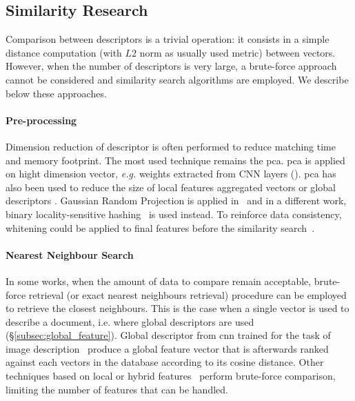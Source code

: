 	\subsection{Similarity Research}
	\label{subsec:similarity_research}

	    Comparison between descriptors is a trivial operation: it consists in a simple distance computation (with $L2$ norm as usually used metric) between vectors. However, when the number of descriptors is very large, a brute-force approach cannot be considered and similarity search algorithms are employed. We describe below these approaches.
	    
		\paragraph{Pre-processing}
        	Dimension reduction of descriptor is often performed to reduce matching time and memory footprint. The most used technique remains the \ac{pca}. \ac{pca} is applied on hight dimension vector, \textit{e.g.} weights extracted from CNN layers (\citep{Arandjelovic2016,Gordo2016}). \ac{pca} has also been used to reduce the size of local features aggregated vectors \citep{Kim2015,Torii2015} or global descriptors \citep{Ni2009}. Gaussian Random Projection is applied in~\citep{Sunderhauf2015a,Panphattarasap2016} and in a different work, binary locality-sensitive hashing~\citep{Sunderhauf2015} is used instead. To reinforce data consistency, whitening could be applied to final features before the similarity search~\citep{Jegou2012a,Gong2014,Tolias2016,Arandjelovic2016,Gordo2016,Radenovic2016}.

		\paragraph{Nearest Neighbour Search}


			In some works, when the amount of data to compare remain acceptable, brute-force retrieval (or exact nearest neighbours retrieval) procedure can be employed to retrieve the closest neighbours. This is the case when a single vector is used to describe a document, i.e. where global descriptors are used (\S\ref{subsec:global_feature}). Global descriptor from \ac{cnn} trained for the task of image description~\citep{Babenko2014,Sunderhauf2015,Radenovic2016,Gordo2016,Arandjelovic2016} produce a global feature vector that is afterwards ranked against each vectors in the database according to its cosine distance. Other techniques based on local or hybrid features~\citep{Zamir2010,Zamir2014,Sunderhauf2015a} perform brute-force comparison, limiting the number of features that can be handled.

